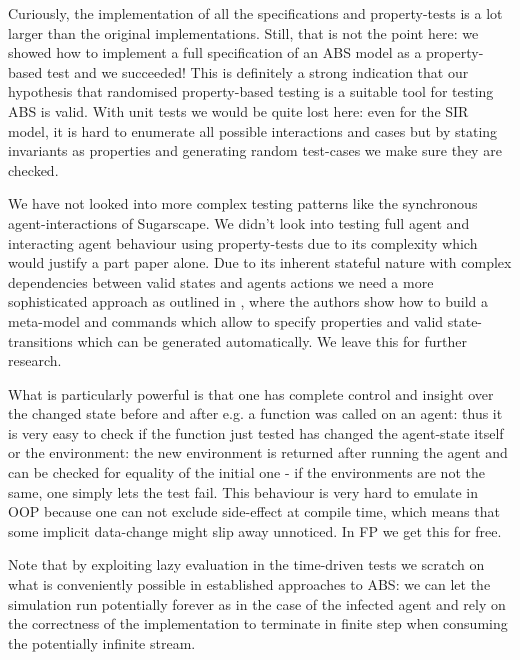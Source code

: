 
Curiously, the implementation of all the specifications and property-tests is a lot larger than the original implementations. Still, that is not the point here: we showed how to implement a full specification of an ABS model as a property-based test and we succeeded! This is definitely a strong indication that our hypothesis that randomised property-based testing is a suitable tool for testing ABS is valid. With unit tests we would be quite lost here: even for the SIR model, it is hard to enumerate all possible interactions and cases but by stating invariants as properties and generating random test-cases we make sure they are checked.

We have not looked into more complex testing patterns like the synchronous agent-interactions of Sugarscape. We didn't look into testing full agent and interacting agent behaviour using property-tests due to its complexity which would justify a part paper alone. Due to its inherent stateful nature with complex dependencies between valid states and agents actions we need a more sophisticated approach as outlined in \cite{de_vries_-depth_2019}, where the authors show how to build a meta-model and commands which allow to specify properties and valid state-transitions which can be generated automatically. We leave this for further research.

What is particularly powerful is that one has complete control and insight over the changed state before and after e.g. a function was called on an agent: thus it is very easy to check if the function just tested has changed the agent-state itself or the environment: the new environment is returned after running the agent and can be checked for equality of the initial one - if the environments are not the same, one simply lets the test fail. This behaviour is very hard to emulate in OOP because one can not exclude side-effect at compile time, which means that some implicit data-change might slip away unnoticed. In FP we get this for free.

Note that by exploiting lazy evaluation in the time-driven tests we scratch on what is conveniently possible in established approaches to ABS: we can let the simulation run potentially forever as in the case of the infected agent and rely on the correctness of the implementation to terminate in finite step when consuming the potentially infinite stream.